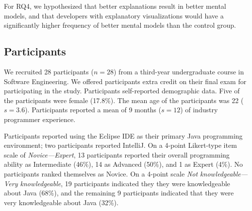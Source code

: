 \documentclass[conference]{IEEEtran}
\begin{document}
For RQ4, we hypothesized that better explanations result in better mental models, and that developers with explanatory visualizations would have a significantly higher frequency of better mental models than the control group.

\subsection{Participants}

We recruited 28 participants ($n = 28$) from a third-year undergraduate course in Software Engineering. We offered participants extra credit on their final exam for participating in the study. Participants self-reported demographic data. Five of the participants were female (17.8\%). The mean age of the participants was 22 ($s = 3.6$). Participants reported a mean of 9 months ($s = 12$) of industry programmer experience.


Participants reported using the Eclipse IDE as their primary Java programming environment; two participants reported IntelliJ. On a 4-point Likert-type item scale of \emph{Novice---Expert}, 13 participants reported their overall programming ability as Intermediate (46\%), 14 as Advanced (50\%), and 1 as Expert (4\%). No participants ranked themselves as Novice. On a 4-point scale \emph{Not knowledgeable---Very knowledgeable}, 19 participants indicated they they were knowledgeable about Java (68\%), and the remaining 9 participants indicated that they were very knowledgeable about Java (32\%).




\end{document}
